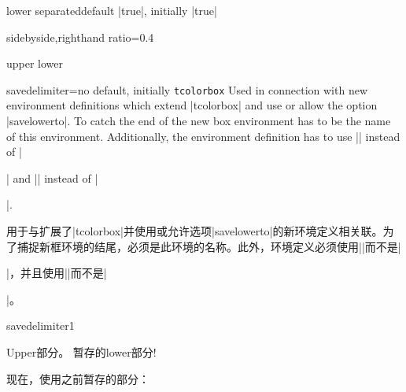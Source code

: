 \begin{docTcbKey}{lower separated}{}{default |true|, initially |true|}
\begin{dispExample*}{sidebyside,righthand ratio=0.4}
\begin{tcolorbox}[beamer,title=Lower not separated%
,lower separated=false]
upper
\tcblower
lower
\end{tcolorbox}
\end{dispExample*}


\end{docTcbKey}




\begin{docTcbKey}{savedelimiter}{=}{no default, initially \texttt{tcolorbox}}
Used in connection with new environment definitions which extend
|tcolorbox| and use or allow the option |savelowerto|.
To catch the end of the new box environment  has to be the name of
this environment. Additionally, the environment definition has to use
|\tcolorbox| instead of
|\begin{tcolorbox}| and |\endtcolorbox| instead of |\end{tcolorbox}|.


用于与扩展了|tcolorbox|并使用或允许选项|savelowerto|的新环境定义相关联。为了捕捉新框环境的结尾，必须是此环境的名称。此外，环境定义必须使用|\tcolorbox|而不是|\begin{tcolorbox}|，并且使用|\endtcolorbox|而不是|\end{tcolorbox}|。

\begin{exdispExample}{savedelimiter1}
\newenvironment{mybox}[1]{%
\tcolorbox[savedelimiter=mybox,
            savelowerto=\jobname_bspsave2.tex,lowerbox=ignored,
            colback=red!5!white,colframe=red!75!black,fonttitle=\bfseries,
            title={#1}]}%
{\endtcolorbox}

\begin{mybox}{暂存 savelowerto 的内容的新环境}
Upper部分。
\tcblower
暂存的lower部分!
\end{mybox}

现在，使用之前暂存的部分：
\begin{tcolorbox}[colback=green!5,title=用到 savelowerto 暂存的内容]

\end{tcolorbox}
\end{exdispExample}


\end{docTcbKey}
